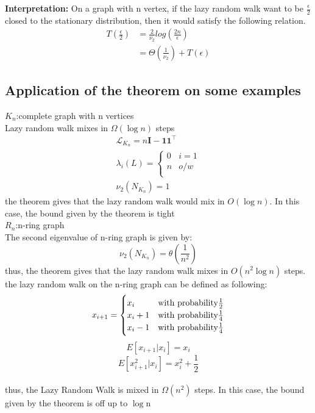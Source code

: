 \documentclass[11pt]{article}
\begin{document}
\textbf{Interpretation:}
On a graph with n vertex, if the lazy random walk want to be $\frac{\epsilon}{2}$ closed to the stationary distribution, then it would satisfy the following relation.\\
\begin{equation*}
    \begin{split}
       T(\frac{\epsilon}{2})
        &= \frac{2}{\nu_2}log(\frac{2n}{\epsilon})\\
        &=\Theta(\frac{1}{\nu_2}) + T(\epsilon)
    \end{split}
\end{equation*}

\subsection{Application of the theorem on some examples}
$K_n$:complete graph with n vertices\\
Lazy random walk mixes in $\Omega(\log n)$ steps\\
\begin{equation*}
    \begin{array}{cc}
        \mathcal{L}_{K_n} = n\textbf{I} - \mathbf{11^\top}\\
        \lambda_i(L) = 
        \begin{cases} 
        0 & i=1 \\
        n & o/w \\
        \end{cases}\\
        \nu_2(N_{K_n}) =  1
    \end{array}
\end{equation*}
the theorem gives that the lazy random walk would mix in $O(\log n)$. In this case, the bound given by the theorem is tight\\

$R_n$:n-ring graph\\
The second eigenvalue of n-ring graph is given by:\\
$$\nu_2(N_{K_n}) = \theta(\frac{1}{n^2})$$
thus, the theorem gives that the lazy random walk mixes in $O(n^2\log
n)$ steps.\\
the lazy random walk on the n-ring graph can be defined as following:\\
\begin{equation*}
    \begin{array}{cc}
        x_{i+1} =
        \begin{cases} 
        x_{i} & $with probability$ \frac{1}{2} \\
        x_{i}+1 & $with probability$ \frac{1}{4} \\
        x_{i}-1 & $with probability$ \frac{1}{4}\\
        \end{cases}\\
    \end{array}
\end{equation*}
        $$E[x_{i+1}|x_{i}] = x_i$$
        $$E[x_{i+1}^2|x_i] = x_i^2 + \frac{1}{2}$$\\
thus, the Lazy Random Walk is mixed in $\Omega(n^2)$ steps. In this case, the bound given by the theorem is off up to $\log$n


\printbibliography
\end{document}
